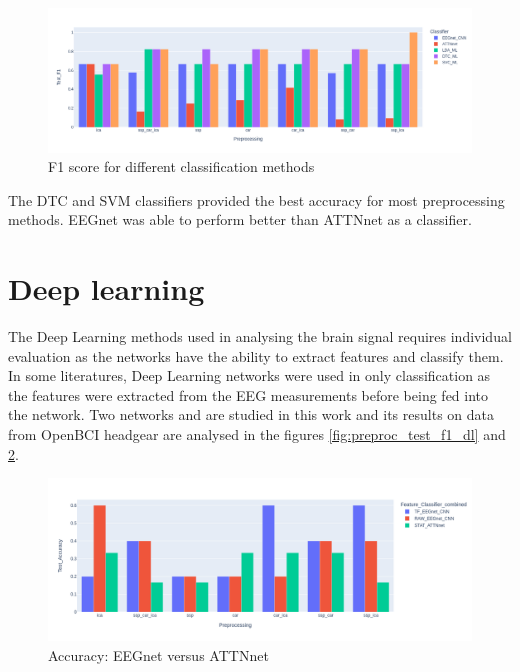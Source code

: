      \begin{figure}[H] 
     \begin{center}
        \includegraphics[width=1.0\textwidth]{images/preproc_test_f1_classifier_bar.png}
        \caption{F1 score for different classification methods}
        \label{fig:preproc_test_f1_classifier}
        \end{center}
    \end{figure}

The DTC and SVM classifiers provided the best accuracy for most preprocessing methods. EEGnet was able to perform better than ATTNnet as a classifier.

\section{Deep learning}
The Deep Learning methods used in analysing the brain signal requires individual evaluation as the networks have the ability to extract features and classify them. In some literatures, Deep Learning networks were used in only classification as the features were extracted from the EEG measurements before being fed into the network. Two networks \cite{2018_EEGNet} and \cite{2019_DLSTM_MI} are studied in this work and its results on data from OpenBCI headgear are analysed in the figures \ref{fig:preproc_test_f1_dl} and \ref{fig:preproc_test_acc_dl}.

     \begin{figure}[H] 
     \begin{center}
        \includegraphics[width=1.0\textwidth]{images/preproc_test_acc_dl_bar.png}
        \caption{Accuracy: EEGnet versus ATTNnet}
        \label{fig:preproc_test_acc_dl}
        \end{center}
    \end{figure}

